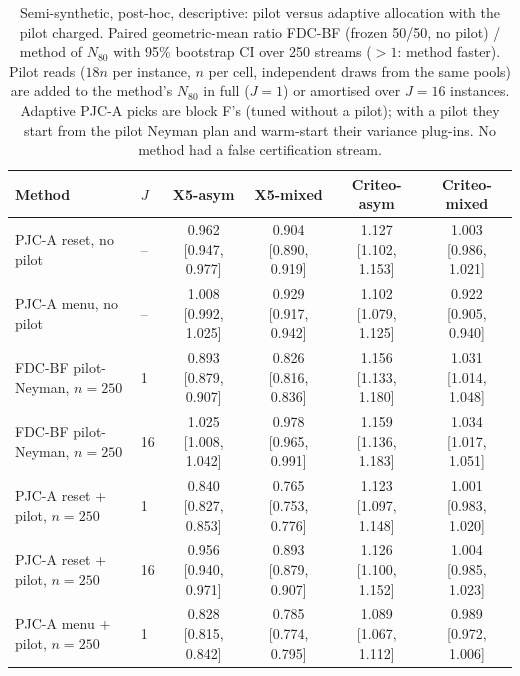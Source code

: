 \begin{table}[t]
\centering\small
\setlength{\tabcolsep}{2.5pt}
\caption{Semi-synthetic, post-hoc, descriptive: pilot versus adaptive allocation with the pilot charged. Paired geometric-mean ratio FDC-BF (frozen 50/50, no pilot) / method of $N_{80}$ with 95\% bootstrap CI over 250 streams ($>1$: method faster). Pilot reads ($18n$ per instance, $n$ per cell, independent draws from the same pools) are added to the method's $N_{80}$ in full ($J{=}1$) or amortised over $J{=}16$ instances. Adaptive PJC-A picks are block F's (tuned without a pilot); with a pilot they start from the pilot Neyman plan and warm-start their variance plug-ins. No method had a false certification stream.}
\label{tab:posthocF2}
\begin{tabular}{llcccc}
\toprule
Method & $J$ & X5-asym & X5-mixed & Criteo-asym & Criteo-mixed \\
\midrule
PJC-A reset, no pilot & -- & 0.962 {\scriptsize[0.947, 0.977]} & 0.904 {\scriptsize[0.890, 0.919]} & 1.127 {\scriptsize[1.102, 1.153]} & 1.003 {\scriptsize[0.986, 1.021]} \\
PJC-A menu, no pilot & -- & 1.008 {\scriptsize[0.992, 1.025]} & 0.929 {\scriptsize[0.917, 0.942]} & 1.102 {\scriptsize[1.079, 1.125]} & 0.922 {\scriptsize[0.905, 0.940]} \\
\midrule
FDC-BF pilot-Neyman, $n{=}250$ & 1 & 0.893 {\scriptsize[0.879, 0.907]} & 0.826 {\scriptsize[0.816, 0.836]} & 1.156 {\scriptsize[1.133, 1.180]} & 1.031 {\scriptsize[1.014, 1.048]} \\
FDC-BF pilot-Neyman, $n{=}250$ & 16 & 1.025 {\scriptsize[1.008, 1.042]} & 0.978 {\scriptsize[0.965, 0.991]} & 1.159 {\scriptsize[1.136, 1.183]} & 1.034 {\scriptsize[1.017, 1.051]} \\
PJC-A reset + pilot, $n{=}250$ & 1 & 0.840 {\scriptsize[0.827, 0.853]} & 0.765 {\scriptsize[0.753, 0.776]} & 1.123 {\scriptsize[1.097, 1.148]} & 1.001 {\scriptsize[0.983, 1.020]} \\
PJC-A reset + pilot, $n{=}250$ & 16 & 0.956 {\scriptsize[0.940, 0.971]} & 0.893 {\scriptsize[0.879, 0.907]} & 1.126 {\scriptsize[1.100, 1.152]} & 1.004 {\scriptsize[0.985, 1.023]} \\
PJC-A menu + pilot, $n{=}250$ & 1 & 0.828 {\scriptsize[0.815, 0.842]} & 0.785 {\scriptsize[0.774, 0.795]} & 1.089 {\scriptsize[1.067, 1.112]} & 0.989 {\scriptsize[0.972, 1.006]} \\

\end{tabular}
\end{table}
